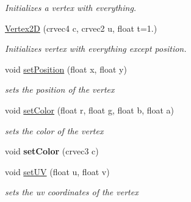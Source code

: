 \begin{DoxyCompactItemize}
\begin{DoxyCompactList}\small\item\em Initializes a vertex with everything. \end{DoxyCompactList}\item 
\mbox{\label{structnta_1_1Vertex2D_a7d73c085f0a4c5140b5d1c5b28256c99}} 
\hyperlink{structnta_1_1Vertex2D_a7d73c085f0a4c5140b5d1c5b28256c99}{Vertex2D} (crvec4 c, crvec2 u, float t=1.)
\begin{DoxyCompactList}\small\item\em Initializes vertex with everything except position. \end{DoxyCompactList}\item 
\mbox{\label{structnta_1_1Vertex2D_a7079a91fd386eb3e4425c965f2ce2592}} 
void \hyperlink{structnta_1_1Vertex2D_a7079a91fd386eb3e4425c965f2ce2592}{set\+Position} (float x, float y)
\begin{DoxyCompactList}\small\item\em sets the position of the vertex \end{DoxyCompactList}\item 
\mbox{\label{structnta_1_1Vertex2D_a12483720589a9836dd4628b2c2bc480c}} 
void \hyperlink{structnta_1_1Vertex2D_a12483720589a9836dd4628b2c2bc480c}{set\+Color} (float r, float g, float b, float a)
\begin{DoxyCompactList}\small\item\em sets the color of the vertex \end{DoxyCompactList}\item 
\mbox{\label{structnta_1_1Vertex2D_a353285f6dc33e239b6c1290f50db1a3a}} 
void {\bfseries set\+Color} (crvec3 c)
\item 
\mbox{\label{structnta_1_1Vertex2D_adb7b7e6498200e6f11965b0ecadeaa97}} 
void \hyperlink{structnta_1_1Vertex2D_adb7b7e6498200e6f11965b0ecadeaa97}{set\+UV} (float u, float v)
\begin{DoxyCompactList}\small\item\em sets the uv coordinates of the vertex \end{DoxyCompactList}\end{DoxyCompactItemize}
